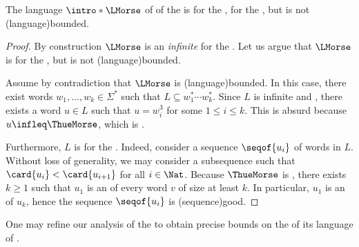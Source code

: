 \begin{lemma}
    \label{thue-morse:lemma}
    The language $\intro*\LMorse$ of  of the 
    is  for the ,  for the , but is not
    \kl(language){bounded}.
\end{lemma}
\begin{proof}
    By construction $\LMorse$ is an \emph{infinite}
     for the . Let us argue that $\LMorse$ is
     for the , but is not \kl(language){bounded}.

    Assume by contradiction that $\LMorse$ is \kl(language){bounded}. In this case, there exist
    words $w_1, \dots, w_k \in \Sigma^*$ such that $L \subseteq w_1^* \cdots
    w_k^*$. Since $L$ is infinite and , there exists a
    word $u \in L$ such that $u = w_i^3$ for some $1 \leq i \leq k$. This is absurd
    because $u \infleq \ThueMorse$, which is .

    Furthermore, $L$ is  for the .
    Indeed, consider a sequence $\seqof{u_i}$ of words in $L$. Without loss of
    generality, we may consider a subsequence such that $\card{u_i} <
    \card{u_{i+1}}$ for all $i \in \Nat$. Because $\ThueMorse$ is , there exists $k \geq 1$ such that $u_1$ is an  of
    every word $v$ of size at least $k$. In particular, $u_1$ is an 
    of $u_k$, hence the sequence $\seqof{u_i}$ is \kl(sequence){good}.
\end{proof}

One may refine our analysis of the  to obtain 
precise bounds on the  of its language of .

